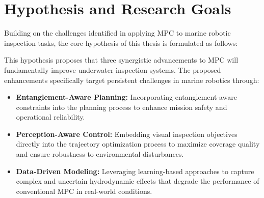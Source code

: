 


\section{Hypothesis and Research Goals}
Building on the challenges identified in applying \ac{MPC} to marine robotic inspection tasks, the core hypothesis of this thesis is formulated as follows:


\begin{figure}[h!]
    \centering
    
    \label{fig:revised_hypothesis_separate}
\end{figure}

This hypothesis proposes that three synergistic advancements to \ac{MPC} will fundamentally improve underwater inspection systems. The proposed enhancements specifically target persistent challenges in marine robotics through:

\begin{itemize}
    \item \textbf{Entanglement-Aware Planning:} Incorporating entanglement-aware constraints into the planning process to enhance mission safety and operational reliability.
    
      \item \textbf{Perception-Aware Control:} Embedding visual inspection objectives directly into the trajectory optimization process to maximize coverage quality and ensure robustness to environmental disturbances.
    
    \item \textbf{Data-Driven Modeling:} Leveraging learning-based approaches to capture complex and uncertain hydrodynamic effects that degrade the performance of conventional \ac{MPC} in real-world conditions.
    

\end{itemize}

